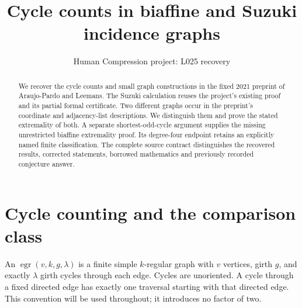 \documentclass[11pt,a4paper]{article}
\title{Cycle counts in biaffine and Suzuki incidence graphs}
\author{Human Compression project: L025 recovery}
\date{}
\begin{document}
\maketitle
\begin{abstract}
We recover the cycle counts and small graph constructions in the fixed
2021 preprint of Araujo-Pardo and Leemans. The Suzuki calculation reuses
the project's existing proof and its partial formal certificate. Two
different graphs occur in the preprint's coordinate and adjacency-list
descriptions. We distinguish them and prove the stated extremality of
both. A separate shortest-odd-cycle argument supplies the missing
unrestricted biaffine extremality proof. Its degree-four endpoint retains
an explicitly named finite classification. The complete source contract
distinguishes the recovered results, corrected statements, borrowed
mathematics and previously recorded conjecture answer.
\end{abstract}

\section{Cycle counting and the comparison class}
An $\operatorname{egr}(v,k,g,\lambda)$ is a finite simple $k$-regular graph
with $v$ vertices, girth $g$, and exactly $\lambda$ girth cycles through
each edge. Cycles are unoriented. A cycle through a fixed directed edge
has exactly one traversal starting with that directed edge. This convention
will be used throughout; it introduces no factor of two.
\end{document}
